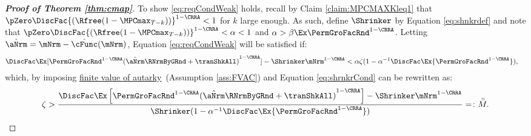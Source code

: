 \documentclass[\econtexRoot/BufferStockTheory]{subfiles}
\begin{document}
\begin{proof}[\textbf{Proof of Theorem \ref{thm:cmap}}]
To show \eqref{eq:reqCondWeak} holds, recall by Claim \ref{claim:MPCMAXKleq1} that $\pZero \DiscFac {(\Rfree (1-\MPCmax_{T-k}))}^{1-\CRRA}   < 1$ for $k$ large enough.
As such, define $\Shrinker$ by Equation \eqref{eq:shnkrdef} and note that $\pZero \DiscFac {(\Rfree (1-\MPCmax_{T-k}))}^{1-\CRRA} < \alpha < 1$ and $\alpha> \beta\Ex\PermGroFacRnd^{1-\CRRA}$.
Letting $\hat{\aNrm} = \mNrm - \hat{\cFunc}(\mNrm)$, Equation \eqref{eq:reqCondWeak} will be satisfied if:
%
\begin{align*}
  \DiscFac \Ex [{\PermGroFacRnd^{1-\CRRA }}{(\hat{\aNrm}\RNrmByGRnd+\tranShkAll)}^{1-\CRRA}]-\Shrinker\mNrm^{1-\CRRA}  & < \alpha\zeta(1-\alpha^{-1}\DiscFac\Ex {\PermGroFacRnd^{1-\CRRA }}),
\end{align*}
%
which, by imposing \hyperlink{FVAC}{finite value of autarky}~(Assumption \ref{ass:FVAC}) and Equation \eqref{eq:shrnkrCond} can be rewritten as:
%
\begin{equation}\begin{gathered}\begin{aligned}
      \zeta >\frac{\DiscFac \Ex\left[\PermGroFacRnd^{1-\CRRA}{(\hat{\aNrm}\RNrmByGRnd +\tranShkAll)}^{1-\CRRA}\right]- \Shrinker\mNrm^{1-\CRRA}}{\Shrinker(1-\alpha^{-1}\DiscFac\Ex {\PermGroFacRnd^{1-\CRRA }})}= \colon\bar{\bar{M}} \label{eq:KeyCondition}.
    \end{aligned}\end{gathered}\end{equation}


\end{proof}
\end{document}
